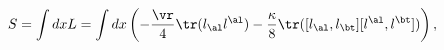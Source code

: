 \begin{equation}                                        \label{eskact}
  S=\int dx L=\int dx\left(-\frac\vr4\tr(l_\al l^\al)
  -\frac\kappa8\tr([l_\al,l_\bt][l^\al,l^\bt])\right),
\end{equation}

